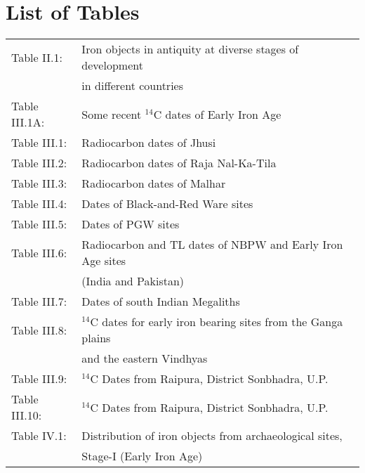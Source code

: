 \chapter*{List of Tables}\label{table}


\vspace{-1cm}

{\fontsize{7}{10}\selectfont\begin{longtable}{ll}
Table II.1:	&Iron objects in antiquity at diverse stages of development\\[2pt]
            
            &  in different countries \\[2pt]
            
Table III.1A:&	Some recent $^{14}$C dates of Early Iron Age\\[2pt]

Table III.1:&	Radiocarbon dates of Jhusi\\[2pt]

Table III.2:&	Radiocarbon dates of Raja Nal-Ka-Tila\\[2pt]

Table III.3:&	Radiocarbon dates of Malhar\\[2pt]

Table III.4:&	Dates of Black-and-Red Ware sites \\[2pt]

Table III.5:&	Dates of PGW sites \\[2pt]

Table III.6:&	Radiocarbon and TL dates of NBPW and Early Iron Age sites\\
            
            &  (India and Pakistan)\\[2pt]
Table III.7:&	Dates of south Indian Megaliths\\ [2pt]

Table III.8:&	$^{14}$C dates for early iron bearing sites from the Ganga plains\\[2pt]
            
            & and the eastern Vindhyas\\[2pt]

Table III.9:&  $^{14}$C Dates from Raipura, District Sonbhadra, U.P.\\[2pt]

Table III.10: & $^{14}$C Dates from Raipura, District Sonbhadra, U.P.\\[2pt]

Table IV.1:&	Distribution of iron objects from archaeological sites,\\[2pt]
           & Stage-I (Early Iron Age)\\[2pt]


\end{longtable}}
